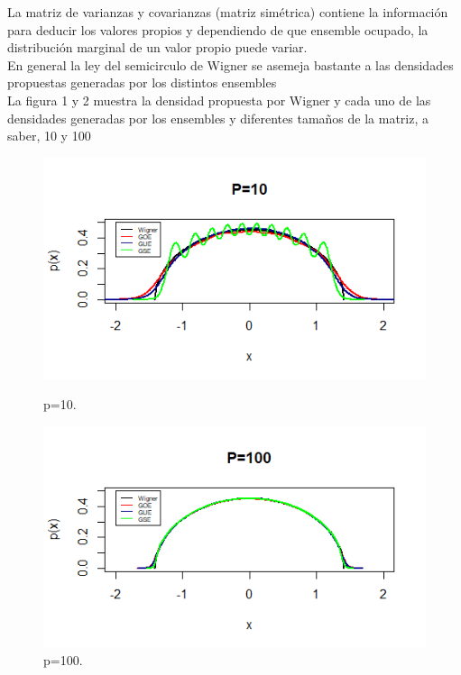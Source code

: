 \documentclass[paper=letter, fontsize=14pt]{scrartcl}
\numberwithin{equation}{section} %
\numberwithin{figure}{section} %
\numberwithin{table}{section} %
\begin{document}
La matriz de varianzas y covarianzas (matriz simétrica) contiene la información para deducir los valores propios y dependiendo de que ensemble ocupado, la distribución marginal de un valor propio puede variar.\\

En general la ley del semicirculo de Wigner se asemeja bastante a las densidades propuestas generadas por los distintos ensembles\\

La figura 1 y 2 muestra la densidad propuesta por Wigner y cada uno de las densidades generadas por los ensembles y diferentes tamaños de la matriz, a saber, 10 y 100


\begin{figure}[h]
  \centering
  \begin{minipage}[b]{0.47\textwidth}
    \includegraphics[width=\textwidth]{i1.png}
    \caption{p=10.}
  \end{minipage}
  \hfill
  \begin{minipage}[b]{0.47\textwidth}
    \includegraphics[width=\textwidth]{i2.png}
    \caption{p=100.}
  \end{minipage}
\end{figure}
\end{document}
